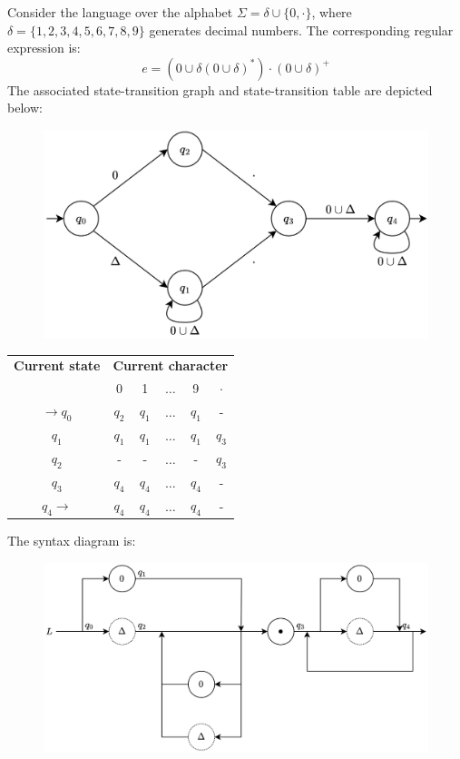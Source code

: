 \begin{example}
    Consider the language over the alphabet $\Sigma=\delta \cup \{0,\cdot\}$, where $\delta=\{1,2,3,4,5,6,7,8,9\}$ generates decimal numbers. 
    The corresponding regular expression is:
    \[e=\left( 0 \cup \delta (0 \cup \delta)^{\ast} \right) \cdot (0 \cup \delta)^{+}\]
    The associated state-transition graph and state-transition table are depicted below:
    \begin{figure}[H]
        \centering
        \includegraphics[width=0.75\linewidth]{images/fsa1.png}
    \end{figure}
    \begin{table}[H]
        \centering
        \begin{tabular}{|c|ccccc|}
        \hline
        \textbf{Current state} & \multicolumn{5}{c|}{\textbf{Current character}}\\ \cline {2-6}
                               & 0      & 1      & $\dots$  & 9      & $\cdot$  \\ \hline
        $\rightarrow q_0$      & $q_2$  & $q_1$  & $\dots$  & $q_1$  & -        \\
        $q_1$                  & $q_1$  & $q_1$  & $\dots$  & $q_1$  & $q_3$    \\
        $q_2$                  & -      & -      & $\dots$  & -      & $q_3$    \\
        $q_3$                  & $q_4$  & $q_4$  & $\dots$  & $q_4$  & -        \\
        $q_4 \rightarrow$      & $q_4$  & $q_4$  & $\dots$  & $q_4$  & -        \\ \hline
        \end{tabular}
    \end{table}
    The syntax diagram is:
    \begin{figure}[H]
        \centering
        \includegraphics[width=0.75\linewidth]{images/fsa2.png}
    \end{figure}
\end{example}